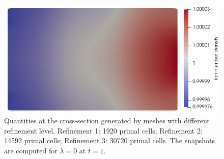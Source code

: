 \documentclass{report}
\begin{document}
\begin{figure}
    \includegraphics[scale=0.27]{slice_ni_T-1_lambda-0_32-3-4.png}
    \caption{Quantities at the cross-section generated by meshes with different refinement level. Refinement 1: 1920 primal cells; Refinement 2: 14592 primal cells; Refinement 3: 30720 primal cells. The snapshots are computed for $\lambda = 0$ at $t = 1$.}
    \label{fig:grid_study_3d_clip_lambda-0}
\end{figure}
\end{document}
